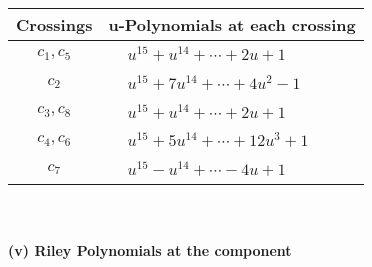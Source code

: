 \documentclass[1p]{elsarticle_modified}
\theoremstyle{definition}
\begin{document}
\begin{tabular}{m{50pt}|m{274pt}}
Crossings & \hspace{64pt}u-Polynomials at each crossing \\
\hline $$\begin{aligned}c_{1},c_{5}\end{aligned}$$&$\begin{aligned}
&u^{15}+u^{14}+\cdots+2 u+1
\end{aligned}$\\
\hline $$\begin{aligned}c_{2}\end{aligned}$$&$\begin{aligned}
&u^{15}+7 u^{14}+\cdots+4 u^2-1
\end{aligned}$\\
\hline $$\begin{aligned}c_{3},c_{8}\end{aligned}$$&$\begin{aligned}
&u^{15}+u^{14}+\cdots+2 u+1
\end{aligned}$\\
\hline $$\begin{aligned}c_{4},c_{6}\end{aligned}$$&$\begin{aligned}
&u^{15}+5 u^{14}+\cdots+12 u^3+1
\end{aligned}$\\
\hline $$\begin{aligned}c_{7}\end{aligned}$$&$\begin{aligned}
&u^{15}- u^{14}+\cdots-4 u+1
\end{aligned}$\\
\hline
\end{tabular}\\~\\
\newpage\renewcommand{\arraystretch}{1}
\flushleft \textbf{(v) Riley Polynomials at the component}\newline \\
\end{document}
